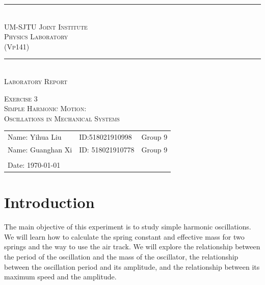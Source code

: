 \documentclass[a4paper]{report}
\begin{document}
	\renewcommand\thesection{\arabic{section}}
	\begin{Large}
		\begin{center}
			\setlength{\baselineskip}{14pt}
			\vspace{1.25cm}
			\rule[0cm]{11.2cm}{0.03em}\\
			\vspace{0.5cm}
			\textsc{UM-SJTU Joint Institute}\\
			\vspace{0.25cm}
			\textsc{Physics Laboratory\\(Vp141)}
			\vspace{0.3cm}
			\rule[0cm]{11.8cm}{0.05em}
			\vspace{4.9cm}\\
			\textsc{Laboratory Report}
		\end{center}
	\end{Large}
	\vspace{0.85cm}
	\begin{large}
		\begin{center}
			\textsc{Exercise 3}
			\vspace{1em}\\
			\textsc{Simple Harmonic Motion:\\Oscillations in Mechanical Systems}
		\end{center}
		\vspace{6cm}
	\end{large}
	\begin{tabular}{l l l}
	Name: Yihua Liu&ID:518021910998&Group 9\\
	Name: Guanghan Xi&ID: 518021910778&Group 9\\
	&&\\
	Date: \today&&\\
	\end{tabular}
	\thispagestyle{empty}
	\newpage
	\section{Introduction}
	The main objective of this experiment is to study simple harmonic oscillations. We will learn how to calculate the spring constant and effective mass for two springs and the way to use the air track. We will explore the relationship between the period of the oscillation and the mass of the oscillator, the relationship between the oscillation period and its amplitude, and the relationship between its maximum speed and the amplitude.
	
\end{document}

